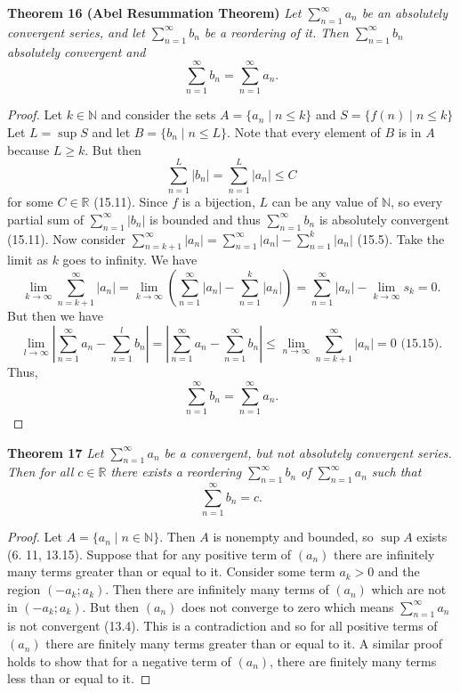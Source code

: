 \documentclass{article}
\begin{document}
\begin{flushleft}
\textbf{Theorem 16 (Abel Resummation Theorem)}
\textsl{Let $\sum_{n=1}^{\infty} a_n$ be an absolutely convergent series, and let $\sum_{n=1}^{\infty} b_n$ be a reordering of it. Then $\sum_{n=1}^{\infty} b_n$ absolutely convergent and
\[
\sum_{n=1}^{\infty} b_n = \sum_{n=1}^{\infty} a_n.
\]}
\begin{proof}
Let $k \in \mathbb{N}$ and consider the sets $A = \{a_n \mid n \leq k\}$ and $S = \{f(n) \mid n \leq k\}$ Let $L = \sup S$ and let $B = \{b_n \mid n \leq L\}$. Note that every element of $B$ is in $A$ because $L \geq k$. But then
\[
\sum_{n=1}^{L} |b_n| = \sum_{n=1}^{L} |a_n| \leq C
\]
for some $C \in \mathbb{R}$ (15.11). Since $f$ is a bijection, $L$ can be any value of $\mathbb{N}$, so every partial sum of $\sum_{n=1}^{\infty} |b_n|$ is bounded and thus $\sum_{n=1}^{\infty} b_n$ is absolutely convergent (15.11). Now consider $\sum_{n=k+1}^{\infty} |a_n| = \sum_{n=1}^{\infty} |a_n| - \sum_{n=1}^{k} |a_n|$ (15.5). Take the limit as $k$ goes to infinity. We have
\[
\lim_{k \rightarrow \infty} \sum_{n=k+1}^{\infty} |a_n| = \lim_{k \rightarrow \infty} \left ( \sum_{n=1}^{\infty} |a_n| - \sum_{n=1}^{k} |a_n| \right ) = \sum_{n=1}^{\infty} |a_n| - \lim_{k \rightarrow \infty} s_k = 0.
\]
But then we have
\[
\lim_{l \rightarrow \infty} \left | \sum_{n=1}^{\infty} a_n - \sum_{n=1}^{l} b_n \right | = \left | \sum_{n=1}^{\infty} a_n - \sum_{n=1}^{\infty} b_n \right | \leq \lim_{n \rightarrow \infty} \sum_{n=k+1}^{\infty} |a_n| = 0 \text{ (15.15)}.
\]
Thus,
\[
\sum_{n=1}^{\infty} b_n = \sum_{n=1}^{\infty} a_n.
\]
\end{proof}

\textbf{Theorem 17}
\textsl{Let $\sum_{n=1}^{\infty} a_n$ be a convergent, but not absolutely convergent series. Then for all $c \in \mathbb{R}$ there exists a reordering $\sum_{n=1}^{\infty} b_n$ of $\sum_{n=1}^{\infty} a_n$ such that
\[
\sum_{n=1}^{\infty} b_n = c.
\]}
\begin{proof}
Let $A = \{a_n \mid n \in \mathbb{N}\}$. Then $A$ is nonempty and bounded, so $\sup A$ exists (6. 11, 13.15). Suppose that for any positive term of $(a_n)$ there are infinitely many terms greater than or equal to it. Consider some term $a_k>0$ and the region $(-a_k ; a_k)$. Then there are infinitely many terms of $(a_n)$ which are not in $(-a_k ; a_k)$. But then $(a_n)$ does not converge to zero which means $\sum_{n=1}^{\infty} a_n$ is not convergent (13.4). This is a contradiction and so for all positive terms of $(a_n)$ there are finitely many terms greater than or equal to it. A similar proof holds to show that for a negative term of $(a_n)$, there are finitely many terms less than or equal to it.\newline


\end{proof}
\end{flushleft}
\end{document}
